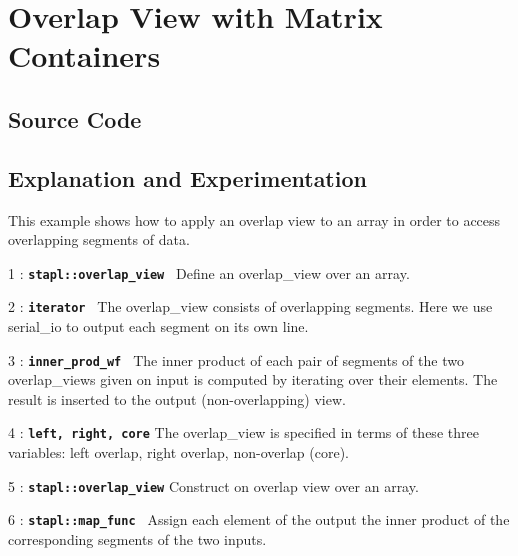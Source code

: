 \documentclass{report}
\begin{document}

\pagebreak
\section{Overlap View with Matrix Containers}

\subsection{Source Code}



\subsection{Explanation and Experimentation}

This example shows how to apply an overlap view to an array in order to access
overlapping segments of data.

\begin{hashitemize}
\item 1 : \texttt{{\bf stapl::overlap\_view }}
\newline
Define an overlap\_view over an array.

\item 2 : \texttt{{\bf iterator }}
\newline
The overlap\_view consists of overlapping segments. Here we use serial\_io to
output each segment on its own line.

\item 3 : \texttt{{\bf inner\_prod\_wf }}
\newline
The inner product of each pair of segments of the two overlap\_views given on
input is computed by iterating over their elements. The result is inserted to
the output (non-overlapping) view.

\item 4 : \texttt{{\bf left, right, core}}
\newline
The overlap\_view is specified in terms of these three variables:
left overlap, right overlap, non-overlap (core).

\item 5 : \texttt{{\bf stapl::overlap\_view}}
\newline
Construct on overlap view over an array.

\item 6 : \texttt{{\bf stapl::map\_func }}
\newline
Assign each element of the output the inner product of the corresponding
segments of the two inputs.

\end{hashitemize}
\end{document}
